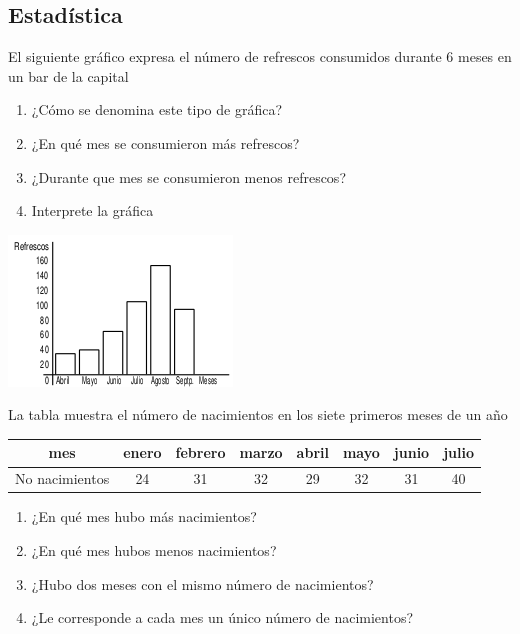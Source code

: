 \documentclass[10pt,twoside]{article}
\begin{document}
\begin{enumerate}
\section*{Estad\'{i}stica}
\begin{minipage}{.4\textwidth}
\item El siguiente gr\'{a}fico expresa el n\'{u}mero de refrescos consumidos durante 6 meses en un bar de la capital
\begin{enumerate}
\item ¿Cómo se denomina este tipo de gráfica?
\item ¿En qué mes se consumieron más refrescos?
\item ¿Durante que mes se consumieron menos refrescos?
\item Interprete la gráfica
\end{enumerate}
\end{minipage} \hfill
\begin{minipage}{.55\textwidth}
\includegraphics[scale=1]{Images/barras.png} 
\end{minipage}
\item La tabla muestra el número de nacimientos en los siete primeros meses de un año
\begin{center}
\begin{tabular}{|c|c|c|c|c|c|c|c|}
\hline 
mes & enero & febrero & marzo & abril & mayo & junio & julio \\ 
\hline 
No nacimientos & 24 & 31 & 32 & 29 & 32 & 31 & 40 \\ 
\hline 
\end{tabular} 
\end{center}
\begin{enumerate}
\item ¿En qué mes hubo más nacimientos?
\item ¿En qué mes hubos menos nacimientos?
\item ¿Hubo dos meses con el mismo número de nacimientos?
\item ¿Le corresponde a cada mes un único número de nacimientos?
\end{enumerate}
\end{enumerate}
\end{document}
